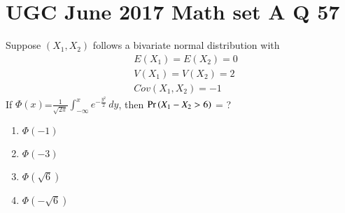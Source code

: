 \documentclass[journal,12pt,twocolumn]{IEEEtran}
\begin{document}
\section*{UGC June 2017 Math set A Q 57 }
Suppose $(X_1,X_2)$ follows a bivariate  normal distribution with
\begin{align}
    &E(X_1)=E(X_2)=0\\
    &V(X_1)=V(X_2)=2\\
    &Cov(X_1,X_2)=-1
\end{align}
If $\Phi(x)$=$\frac{1}{ \sqrt{2\pi}}\int_{-\infty}^{x}e^{-\frac{{y}^2}{2}}\, dy$, then $\Pr\left(X_1-X_2>6\right)$ = ?
\begin{enumerate}
    \item $\Phi(-1)$
    \item $\Phi(-3)$
    \item $\Phi(\sqrt{6})$
    \item $\Phi(-\sqrt{6})$
\end{enumerate}
\end{document}
